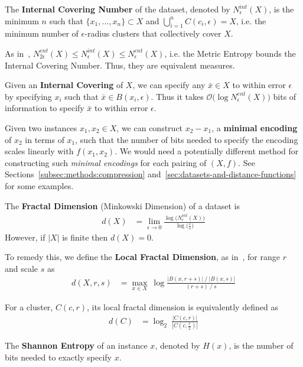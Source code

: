 The \textbf{Internal Covering Number} of the dataset, denoted by $N_{\epsilon}^{int}(X)$, is the minimum $n$ such that $\{x_1, \dots, x_n\} \subset X$ and $\bigcup_{i = 1}^{n} C(c_i, \epsilon) = X$, i.e. the minimum number of $\epsilon$-radius clusters that collectively cover $X$.

As in~\cite{berger2020levenshtein}, $N_{2\epsilon}^{ent}(X) \leq N_{\epsilon}^{int}(X) \leq N_{\epsilon}^{ent}(X)$, i.e. the Metric Entropy bounds the Internal Covering Number.
Thus, they are equivalent measures.

Given an \textbf{Internal Covering} of $X$, we can specify any $\bar{x} \in X$ to within error $\epsilon$ by specifying $x_i$ such that $\bar{x} \in B(x_i, \epsilon)$.
Thus it takes $\mathcal{O} \big( \log N_{\epsilon}^{ent}(X) \big)$ bits of information to specify $\bar{x}$ to within error $\epsilon$.

Given two instances $x_1, x_2 \in X$, we can construct $x_2 - x_1$, a \textbf{minimal encoding} of $x_2$ in terms of $x_1$, such that the number of bits needed to specify the encoding scales linearly with $f(x_1, x_2)$.
We would need a potentially different method for constructing such \textit{minimal encodings} for each pairing of $(X, f)$.
See Sections~\ref{subsec:methods:compression} and~\ref{sec:datasets-and-distance-functions} for some examples.

The \textbf{Fractal Dimension} (Minkowski Dimension) of a dataset is
\begin{align*}
    d(X) &= \lim_{\epsilon \rightarrow 0} \frac{\log \big( N_{\epsilon}^{int}(X) \big) }{\log \big( \frac{1}{\epsilon} \big)}
\end{align*}
However, if $|X|$ is finite then $d(X) = 0$.

To remedy this, we define the \textbf{Local Fractal Dimension}, as in~\cite{berger2020levenshtein}, for range $r$ and scale $s$ as
\begin{align*}
    d(X, r, s) &= \max_{x \in X} \ \log \frac{|B(x, r + s)| \ / \ |B(x, s)|}{(r + s) \ / \ s}
\end{align*}

For a cluster, $C(c, r)$, its local fractal dimension is equivalently defined as
\begin{align}
    \label{eq:local-fractal-dimension}
    d(C) &= \log_2 \ \frac{|C(c, r)|}{|C(c, \frac{r}{2})|}
\end{align}

The \textbf{Shannon Entropy} of an instance $x$, denoted by $H(x)$, is the number of bits needed to exactly specify $x$.

